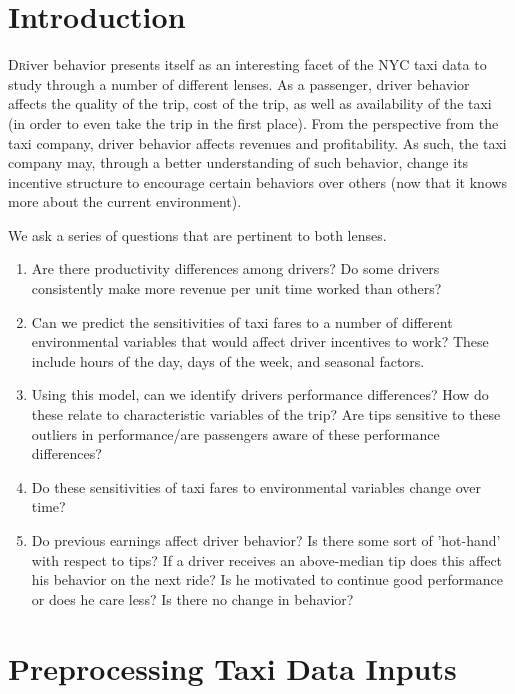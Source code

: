 \documentclass[twoside]{article}
\begin{document}
\begin{multicols}{2} %

\section{Introduction}

\lettrine[nindent=0em,lines=3]{D} river behavior presents itself as an interesting facet of the NYC taxi data to study through a number of different lenses. As a passenger, driver behavior affects the quality of the trip, cost of the trip, as well as availability of the taxi (in order to even take the trip in the first place). From the perspective from the taxi company, driver behavior affects revenues and profitability. As such, the taxi company may, through a better understanding of such behavior, change its incentive structure to encourage certain behaviors over others (now that it knows more about the current environment). 

We ask a series of questions that are pertinent to both lenses. 
\begin{enumerate}
\item Are there productivity differences among drivers? Do some drivers consistently make more revenue per unit time worked than others? 
\item Can we predict the sensitivities of taxi fares to a number of different environmental variables that would affect driver incentives to work? These include hours of the day, days of the week, and seasonal factors.
\item Using this model, can we identify drivers performance differences? How do these relate to characteristic variables of the trip? Are tips sensitive to these outliers in performance/are passengers aware of these performance differences?
\item Do these sensitivities of taxi fares to environmental variables change over time?
\item Do previous earnings affect driver behavior? Is there some sort of 'hot-hand' with respect to tips? If a driver receives an above-median tip does this affect his behavior on the next ride? Is he motivated to continue good performance or does he care less? Is there no change in behavior?


\end{enumerate}


\section{Preprocessing Taxi Data Inputs}


\end{multicols}
\end{document}
